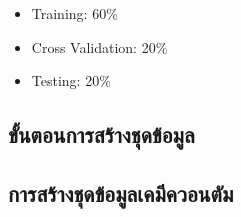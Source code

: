 \begin{itemize}
    \item Training: 60\%
    \item Cross Validation: 20\%
    \item Testing: 20\%
\end{itemize}

\subsection{ขั้นตอนการสร้างชุดข้อมูล}


\subsection{การสร้างชุดข้อมูลเคมีควอนตัม}
